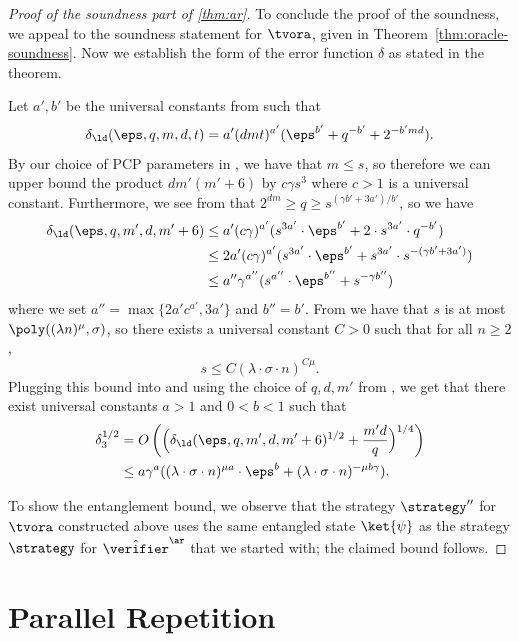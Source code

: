 \begin{proof}[Proof of the soundness part of \cref{thm:ar}]
	To conclude the proof of the soundness, we appeal to the soundness statement
  for $\tvora$, given in Theorem~\ref{thm:oracle-soundness}.
  Now we establish the form of the error function $\delta$ as stated in the
  theorem. 
  
  Let $a',b'$ be the universal constants from  such that
  \[
    \delta_\ld(\eps,q,m,d,t) = a' (dmt)^{a'} (\eps^{b'} + q^{-b'} + 2^{-b' m d}).
 	\]
	By our choice of PCP parameters in , we have that $m \leq
  s$, so therefore we can upper bound the product $dm'(m' + 6)$ by $c \gamma
  s^3$ where $c > 1$ is a universal constant.
  Furthermore, we see from  that $2^{dm} \geq q \geq s^{(\gamma
    b' + 3a')/b'}$, so we have
	\begin{align}
		\delta_\ld(\eps,q,m',d,m'+6)
    & \leq a' (c\gamma)^{a'} ( s^{3a'} \cdot \eps^{b'} +
      2 \cdot s^{3 a'} \cdot q^{-b'}) \notag \\
    & \leq 2 a' (c\gamma)^{a'} ( s^{3a'} \cdot \eps^{b'} + s^{3 a'}
      \cdot s^{-(\gamma b' + 3a')}) \notag \\
    & \leq a'' \gamma^{a''} ( s^{a''} \cdot \eps^{b''}
      + s^{-\gamma b''}) \label{eq:ar-sound-3}
	\end{align}
	where we set $a'' = \max \{ 2 a' c^{a'} , 3a'\}$ and $b'' = b'$.
From  we
  have that $s$ is at most $\poly( (\lambda n)^\mu , \sigma)$, so there exists a
  universal constant $C > 0$ such that for all $n \geq 2$,
  \[
  	s \leq C ( \lambda \cdot \sigma \cdot n)^{C \mu}.
  \]
  Plugging this bound into  and using the choice of $q,d,m'$
  from , we get that there exist universal constants $a > 1$
  and $0 < b < 1$ such that
  \begin{align*}
    \delta_3^{1/2}
    & = O \left ( \Big (\delta_\ld(\eps, q, m', d, m'+6)^{1/2} +
      \frac{m'd}{q} \Big)^{1/4} \right ) \\
    & \leq a \gamma^a ( (\lambda \cdot \sigma \cdot n)^{\mu a} \cdot \eps^{b}
      + (\lambda \cdot \sigma \cdot n)^{- \mu b \gamma}).
  \end{align*}  
  


  To show the entanglement bound, we observe that the strategy $\strategy''$ for
  $\tvora$ constructed above uses the same entangled state $\ket{\psi}$ as the
  strategy $\strategy$ for $\tvans$ that we started with; the claimed bound
  follows.
\end{proof}


 
 
\section{Parallel Repetition}
